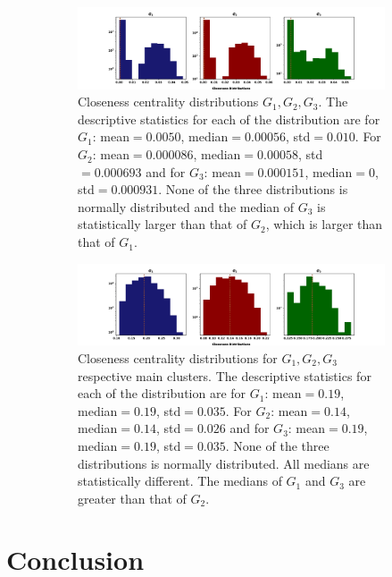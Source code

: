 \documentclass{article}
\theoremstyle{definition}
\begin{document}
\begin{figure}[!hbtp]
    \centering
    \begin{subfigure}{\textwidth}\centering
    \includegraphics[width=\textwidth]{./assets/images/closeness_distributions.pdf}
    \caption{Closeness centrality distributions \(G_1, G_2, G_3\). The descriptive
        statistics for each of the distribution are for \(G_1\): mean\(=0.0050\),
        median\(=0.00056\), std\(=0.010\). For \(G_2\): mean\(=0.000086\), median\(=0.00058\),
        std\(=0.000693\) and for \(G_3\): mean\(=0.000151\), median\(=0\), std\(=0.000931\).
        None of the three distributions is normally distributed and the median
        of \(G_3\) is statistically larger than that of \(G_2\), which is
        larger than that of \(G_1\).}\label{fig:closeness_dist}
\end{subfigure}
\begin{subfigure}{\textwidth}\centering
    \centering
    \includegraphics[width=\textwidth]{./assets/images/closeness_distributions_clusters.pdf}
    \caption{Closeness centrality distributions for \(G_1, G_2, G_3\) respective
    main clusters. The descriptive statistics for each of the distribution are
    for \(G_1\): mean\(=0.19\),
    median\(=0.19\), std\(=0.035\). For \(G_2\): mean\(=0.14\), median\(=0.14\),
    std\(=0.026\) and for \(G_3\): mean\(=0.19\), median\(=0.19\), std\(=0.035\).
    None of the three distributions is normally distributed. All medians
    are statistically different. The medians of \(G_1\) and \(G_3\) are greater
    than that of \(G_2\).}\label{fig:closeness_dist_cluster}
    \end{subfigure}
    \caption{}
\end{figure}

\section{Conclusion}
\end{document}
